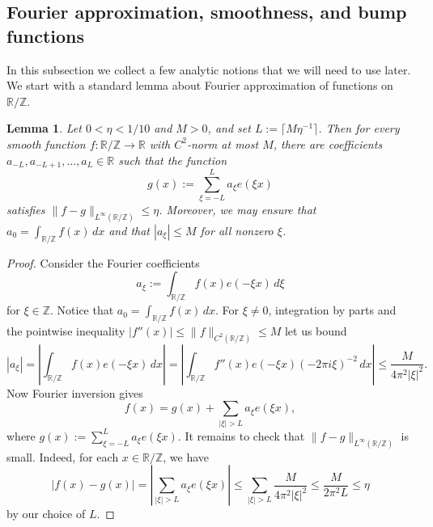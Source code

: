 \documentclass[11pt]{amsart}
\newtheorem{lemma}{Lemma}[section]
\theoremstyle{definition}
\newcommand{\R}{{\mathbb R}}
\newcommand{\Z}{{\mathbb Z}}
\begin{document}


\subsection{Fourier approximation, smoothness, and bump functions}
In this subsection we collect a few analytic notions that we will need to use later.  We start with a standard lemma about Fourier approximation of functions on $\R/\Z$.

\begin{lemma}\label{lem:quantitativefourier}
Let $0<\eta<1/10$ and $M>0$, and set $L:=\lceil M\eta^{-1} \rceil$.  Then for every smooth function $f: \mathbb{R}/\mathbb{Z} \to \mathbb{R}$ with $C^2$-norm at most $M$, there are coefficients $a_{-L},a_{-L+1},\ldots, a_L \in \mathbb{R}$ such that the function $$g(x):=\sum_{\xi=-L}^L a_\xi e(\xi x)$$ satisfies $\|f-g\|_{L^\infty(\R/\Z)} \leq \eta$.  Moreover, we may ensure that $a_0=\int_{\R/\Z}f(x) \,dx$ and that $|a_\xi| \leq M$ for all nonzero $\xi$.
\end{lemma}

\begin{proof}
Consider the Fourier coefficients
$$a_\xi:=\int_{\R/\Z} f(x)e(-\xi x) \,d\xi$$
for $\xi \in \mathbb{Z}$.  Notice that $a_0=\int_{\R/\Z} f(x) \,dx$.  For $\xi \neq 0$, integration by parts and the pointwise inequality $|f''(x)| \leq \|f\|_{C^2(\R/\Z)} \leq M$ let us bound
$$|a_\xi|=\left|\int_{\R/\Z} f(x)e(-\xi x) \,dx \right|= \left|\int_{\R/\Z} f''(x)e(-\xi x)(-2\pi i \xi)^{-2} \,dx \right| \leq \frac{M}{4\pi^2 |\xi|^2}.$$
Now Fourier inversion gives
$$f(x)=g(x)+\sum_{|\xi|>L} a_\xi e(\xi x),$$
where $g(x):=\sum_{\xi=-L}^L a_\xi e(\xi x)$.  It remains to check that $\|f-g\|_{L^\infty(\R/\Z)}$ is small.  Indeed, for each $x \in \R/\Z$, we have
$$|f(x)-g(x)|=\left| \sum_{|\xi|>L} a_\xi e(\xi x) \right| \leq \sum_{|\xi|>L} \frac{M}{4\pi^2 |\xi|^2} \leq \frac{M}{2\pi^2 L} \leq \eta$$
by our choice of $L$.
\end{proof}
\end{document}
